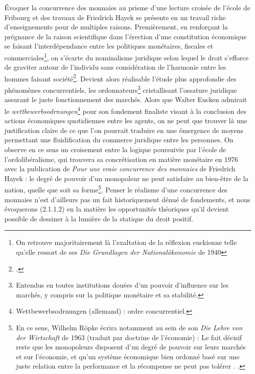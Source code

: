 {Évoquer la concurrence des monnaies au prisme d'une lecture croisée de l'école de Fribourg et des travaux de Friedrich Hayek se présente en un travail riche d'enseignements pour de multiples raisons. Premièrement, en renforçant la prégnance de la raison scientifique dans l'érection d'une constitution économique se faisant l'interdépendance entre les politiques monétaires, fiscales et commerciales\footnote{On retrouve majoritairement là l'exaltation de la réflexion euckienne telle qu'elle ressort de ses \emph{Die Grundlagen der Nationalökonomie} de 1940}, on s'écarte du nominalisme juridique selon lequel le droit s'efforce de graviter autour de l'individu sans considération de l'harmonie entre les hommes faisant société\footnote{.}. Devient alors réalisable l'étude plus approfondie des phénomènes concurrentiels, les ordonnateurs\footnote{Entendus en toutes institutions douées d'un pouvoir d'influence sur les marchés, y compris sur la politique monétaire et sa stabilité.} cristallisant l'ossature juridique assurant le juste fonctionnement des marchés. Alors que Walter Eucken admirait le \emph{wettbewerbsodrnungen}\footnote{Wettbewerbsodrnungen (allemand) : ordre concurrentiel.} pour son fondement finaliste visant à la conclusion des actions économiques quotidiennes entre les agents, on ne peut que trouver là une justification claire de ce que l'on pourrait traduire en une émergence de moyens permettant une fluidification du commerce juridique entre les personnes. On observe en ce sens un croisement entre la logique poursuivie par l'école de l'ordolibéralisme, qui trouvera sa concrétisation en matière monétaire en 1976 avec la publication de \emph{Pour une vraie concurrence des monnaies} de Friedrich Hayek : le degré de pouvoir d'un monopoleur ne peut satisfaire au bien-être de la nation, quelle que soit sa forme\footnote{En ce sens, Wilhelm Röpke écrira notamment au sein de son \emph{Die Lehre von der Wirtschaft} de 1963 (traduit par \og doctrine de l'économie\fg{}) : \og Le fait décisif reste que les monopoleurs disposent d'un degré de pouvoir sur leurs marchés et sur l'économie, et qu'un système économique bien ordonné basé sur une juste relation entre la performance et la récompense ne peut pas tolérer \fg{}. .}. Penser le réalisme d'une concurrence des monnaies n'est d'ailleurs pas un fait historiquement dénué de fondements, et nous évoquerons (2.1.1.2) en la matière les opportunités théoriques qu'il devient possible de dessiner à la lumière de la statique du droit positif.\par

}
